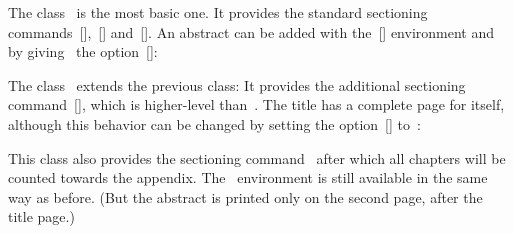 The class~ is the most basic one.
It provides the standard sectioning commands~[\comname],~[\comname] and~[\comname].
An abstract can be added with the~[\envname] environment and by giving~ the option~[\envname]:

The class~ extends the previous class:
It provides the additional sectioning command~[\comname], which is higher-level than~.
The title has a complete page for itself, although this behavior can be changed by setting the option~[\optname] to~:
This class also provides the sectioning command~ after which all chapters will be counted towards the appendix.
The~ environment is still available in the same way as before.
(But the abstract is printed only on the second page, after the title page.)

